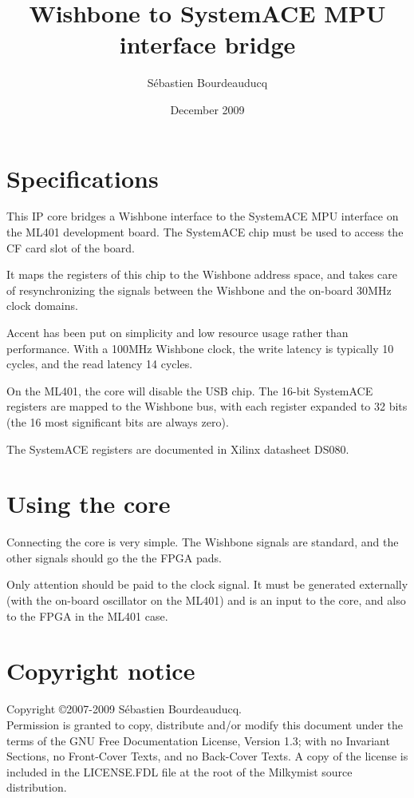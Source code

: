 \documentclass[a4paper,11pt]{article}
\title{Wishbone to SystemACE MPU interface bridge}
\author{S\'ebastien Bourdeauducq}
\date{December 2009}
\begin{document}
\setlength{\parindent}{0pt}
\setlength{\parskip}{5pt}
\maketitle{}
\section{Specifications}
This IP core bridges a Wishbone interface to the SystemACE MPU interface on the ML401 development board. The SystemACE chip must be used to access the CF card slot of the board.

It maps the registers of this chip to the Wishbone address space, and takes care of resynchronizing the signals between the Wishbone and the on-board 30MHz clock domains.

Accent has been put on simplicity and low resource usage rather than performance. With a 100MHz Wishbone clock, the write latency is typically 10 cycles, and the read latency 14 cycles.

On the ML401, the core will disable the USB chip. The 16-bit SystemACE registers are mapped to the Wishbone bus, with each register expanded to 32 bits (the 16 most significant bits are always zero).

The SystemACE registers are documented in Xilinx datasheet DS080.

\section{Using the core}
Connecting the core is very simple. The Wishbone signals are standard, and the other signals should go the the FPGA pads.

Only attention should be paid to the clock signal. It must be generated externally (with the on-board oscillator on the ML401) and is an input to the core, and also to the FPGA in the ML401 case.

\section*{Copyright notice}
Copyright \copyright 2007-2009 S\'ebastien Bourdeauducq. \\
Permission is granted to copy, distribute and/or modify this document under the terms of the GNU Free Documentation License, Version 1.3; with no Invariant Sections, no Front-Cover Texts, and no Back-Cover Texts. A copy of the license is included in the LICENSE.FDL file at the root of the Milkymist source distribution.
\end{document}
